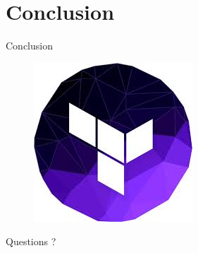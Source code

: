 \documentclass[11pt]{beamer} %
\begin{document}
			
		\section{Conclusion}			
			\begin{frame}{Conclusion}
			\begin{figure}
				\begin{center}
					\includegraphics[scale=0.7]{logoTerraform.jpg}
				\end{center}
			\end{figure}
			\end{frame}
			\begin{frame}
			\begin{center}
			\Huge{Questions ?}
			\end{center}
			\end{frame}
\end{document}
